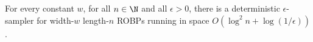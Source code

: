 \begin{theorem} \label{thm:hz-sampler}
For every constant $w$, for all $n \in \N$ and all $\epsilon > 0$, there is a deterministic $\epsilon$-sampler for width-$w$ length-$n$ ROBPs running in space $O(\log^2 n + \log(1/\epsilon))$.
\end{theorem}
